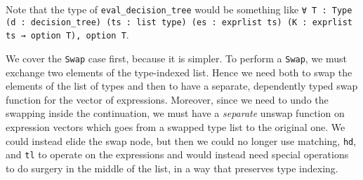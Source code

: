 Note that the type of \texttt{eval_decision_tree} would be something like \texttt{∀ {T : Type} (d : decision_tree) (ts : list type) (es : exprlist ts) (K : exprlist ts → option T), option T}.


We cover the \texttt{Swap} case first, because it is simpler.
To perform a \texttt{Swap}, we must exchange two elements of the type-indexed list.
Hence we need both to swap the elements of the list of types and then to have a separate, dependently typed swap function for the vector of expressions.
Moreover, since we need to undo the swapping inside the continuation, we must have a \emph{separate} unswap function on expression vectors which goes from a swapped type list to the original one.
We could instead elide the swap node, but then we could no longer use matching, \texttt{hd}, and \texttt{tl} to operate on the expressions and would instead need special operations to do surgery in the middle of the list, in a way that preserves type indexing.

